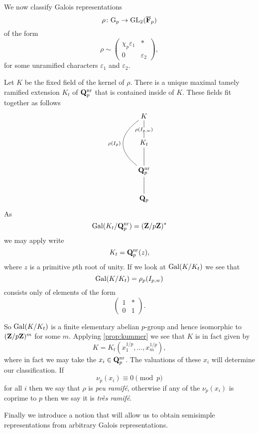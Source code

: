 \documentclass[a4paper,12pt]{article}
\begin{document}
\begin{defn}
We now classify Galois representations
\[
\rho\colon\mathrm{G}_p\to\operatorname{GL}_2(\overline{\mathbf{F}}_p)
\]
of the form
\[
\rho\sim
\begin{pmatrix}
\chi_p\varepsilon_1 & * \\
0 & \varepsilon_2\end{pmatrix},
\]
for some unramified characters $\varepsilon_1$ and $\varepsilon_2$.

Let $K$ be the fixed field of the kernel of $\rho$.
There is a unique maximal tamely ramified extension $K_t$ of $\mathbf{Q}_p^{\mathrm{nr}}$ that is contained inside of $K$.
These fields fit together as follows %
\[
\xymatrix{
K      \ar@{-}[d]|{\rho(I_{p,w})} \ar@{-}@/_2.5pc/[dd]_{\rho(I_{p})}\\
K_t \ar@{-}[d] \\
\Qp^\nr \ar@{-}[d]\\
\Qp \\
}
\]
As
\[
\operatorname{Gal}(K_t/\mathbf{Q}_p^{\mathrm{nr}}) = (\mathbf{Z}/p\mathbf{Z})^*
\]
we may apply write
\[
K_t = \mathbf{Q}_p^{\mathrm{nr}}(z),
\]
where $z$ is a primitive $p$th root of unity.
If we look at $\operatorname{Gal}(K/K_t)$ we see that
\[
\operatorname{Gal}(K/K_t) = \rho_p(I_{p,w})
\]
consists only of elements of the form
\[
\begin{pmatrix}
1 & * \\
0 & 1 \end{pmatrix}.
\]

So $\operatorname{Gal}(K/K_t)$ is a finite elementary abelian $p$-group and hence isomorphic to $(\mathbf{Z}/p\mathbf{Z})^m$ for some $m$.
Applying \cref{prop:kummer} we see that $K$ is in fact given by
\[
K = K_t(x_1^{1/p},\ldots,x_m^{1/p}),
\]
where in fact we may take the $x_i\in\mathbf{Q}_p^{\mathrm{nr}}$.
The valuations of these $x_i$ will determine our classification.
If
\[
\nu_p(x_i) \equiv 0 \pmod{p}
\]
for all $i$ then we say that $\rho$ is \emph{peu ramif\'e}, otherwise if any of the $\nu_p(x_i)$ is coprime to $p$ then we say it is \emph{tr\`es ramif\'e}.
\end{defn}

Finally we introduce a notion that will allow us to obtain semisimple representations from arbitrary Galois representations.
\end{document}
